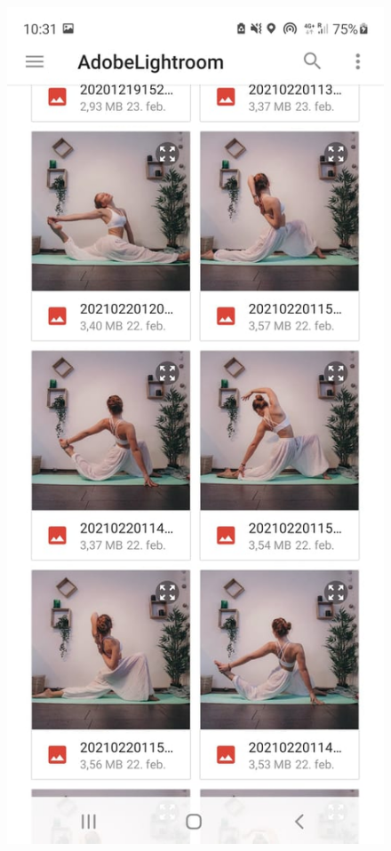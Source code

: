 \documentclass[a4paper, 12pt]{book}
\begin{document}
\begin{figure}[ht]
\centering
  \begin{minipage}[b]{0.35\textwidth}
    \includegraphics[width=\textwidth]{izborslik.jpg}\centering

\end{minipage}
\end{figure}
\end{document}
